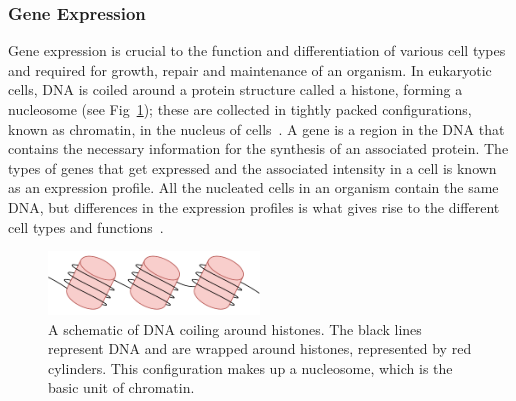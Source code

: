         \subsubsection{Gene Expression}
        Gene expression is crucial to the function and differentiation of various cell types and required for growth, repair and maintenance of an organism.  In eukaryotic cells, DNA is coiled around a protein structure called a histone, forming a nucleosome (see Fig~\ref{fig:chromatin1}); these are collected in tightly packed configurations, known as chromatin, in the nucleus of cells~\cite{alberts2002chromosomal, kornberg1974chromatin}. A gene is a region in the DNA that contains the necessary information for the synthesis of an associated protein. The types of genes that get expressed and the associated intensity in a cell is known as an expression profile. All the nucleated cells in an organism contain the same DNA, but differences in the expression profiles is what gives rise to the different cell types and functions~\cite{lockhart2000genomics}.%

        
            \begin{figure}[H]
                 \centering
            \includegraphics[width=0.5\textwidth]{Chromatin.pdf}
                \caption{A schematic of DNA coiling around histones. The black lines represent DNA and are wrapped around histones, represented by red cylinders. This configuration makes up a nucleosome, which is the basic unit of chromatin.}
                \label{fig:chromatin1}
            \end{figure}
            

        
        

